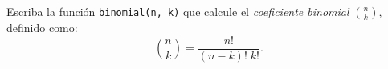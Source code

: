 Escriba la función \texttt{binomial(n, k)}
que calcule el \emph{coeficiente binomial} \(\binom{n}{k}\),
definido como:
\[
  \binom{n}{k} =
    \frac{n!}{(n - k)!\;k!}.
\]



